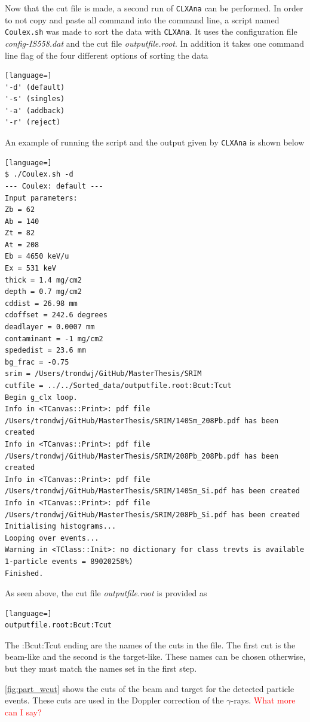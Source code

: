 \documentclass[twoside,english]{uiofysmaster/uiofysmaster}
\newcommand{\ga}{$\gamma$}
\let\orgautoref\autoref
\renewcommand{\autoref}
        {%
		 \def\subsectionautorefname{Section}%
		 \def\subsubsectionautorefname{Section}%
          \orgautoref}
\begin{document}
Now that the cut file is made, a second run of \texttt{CLXAna} can be performed. 
In order to not copy and paste all command into the command line, a script named \texttt{Coulex.sh} was made to sort the data with \texttt{CLXAna}. 
It uses the configuration file \textit{config-IS558.dat} and the cut file \textit{outputfile.root}. 
In addition it takes one command line flag of the four different options of sorting the data
\begin{lstlisting}[language=]
'-d' (default)
'-s' (singles) 
'-a' (addback) 
'-r' (reject)
\end{lstlisting}
An example of running the script and the output given by \texttt{CLXAna} is shown below
\begin{lstlisting}[language=]
$ ./Coulex.sh -d
--- Coulex: default ---
Input parameters:
Zb = 62
Ab = 140
Zt = 82
At = 208
Eb = 4650 keV/u
Ex = 531 keV
thick = 1.4 mg/cm2
depth = 0.7 mg/cm2
cddist = 26.98 mm
cdoffset = 242.6 degrees
deadlayer = 0.0007 mm
contaminant = -1 mg/cm2
spededist = 23.6 mm
bg_frac = -0.75
srim = /Users/trondwj/GitHub/MasterThesis/SRIM
cutfile = ../../Sorted_data/outputfile.root:Bcut:Tcut
Begin g_clx loop.
Info in <TCanvas::Print>: pdf file /Users/trondwj/GitHub/MasterThesis/SRIM/140Sm_208Pb.pdf has been created
Info in <TCanvas::Print>: pdf file /Users/trondwj/GitHub/MasterThesis/SRIM/208Pb_208Pb.pdf has been created
Info in <TCanvas::Print>: pdf file /Users/trondwj/GitHub/MasterThesis/SRIM/140Sm_Si.pdf has been created
Info in <TCanvas::Print>: pdf file /Users/trondwj/GitHub/MasterThesis/SRIM/208Pb_Si.pdf has been created
Initialising histograms...
Looping over events...
Warning in <TClass::Init>: no dictionary for class trevts is available
1-particle events = 89020258%)    
Finished.
\end{lstlisting}
As seen above, the cut file \textit{outputfile.root} is provided as  
\begin{lstlisting}[language=]
outputfile.root:Bcut:Tcut
\end{lstlisting}
The :Bcut:Tcut ending are the names of the cuts in the file. The first cut is the beam-like and the second is the target-like. 
These names can be chosen otherwise, but they must match the names set in the first step. 

\autoref{fig:part_wcut} shows the cuts of the beam and target for the detected particle events. 
These cuts are used in the Doppler correction of the \ga-rays. 
\textcolor{red}{What more can I say?}
\end{document}
